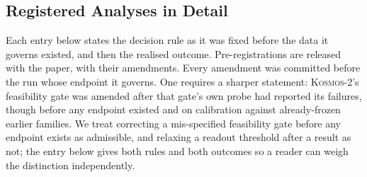 \subsection{Registered Analyses in Detail}
\label{app:prereg-detail}

Each entry below states the decision rule as it was fixed before the data it governs existed, and
then the realised outcome. Pre-registrations are released with the paper, with their amendments.
Every amendment was committed before the run whose endpoint it governs. One requires a sharper
statement: \textsc{Kosmos-2}'s feasibility gate was amended after that gate's own probe had
reported its failures, though before any endpoint existed and on calibration against already-frozen
earlier families. We treat correcting a mis-specified feasibility gate before any endpoint exists as
admissible, and relaxing a readout threshold after a result as not; the entry below gives both rules
and both outcomes so a reader can weigh the distinction independently.

